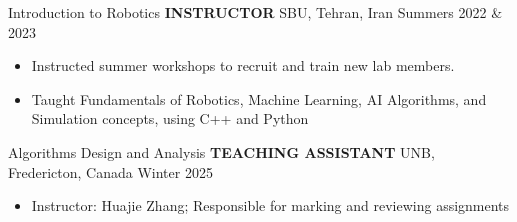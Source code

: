     
\begin{cventries}
    \cventry
    {Introduction to Robotics}
    {\textbf{INSTRUCTOR}}
    {SBU, Tehran, Iran}
    {Summers 2022 \& 2023}
    {
        \begin{itemize}
            \item Instructed summer workshops to recruit and train new lab members.
            \item Taught Fundamentals of Robotics, Machine Learning, AI Algorithms, and Simulation concepts, using C++ and Python
        \end{itemize}
    }
    \vspace{0.4 cm}
\end{cventries}
                    
\begin{cventries}
    \cventry
    {Algorithms Design and Analysis}
    {\textbf{TEACHING ASSISTANT}}
    {UNB, Fredericton, Canada}
    {Winter 2025}
    {
        \begin{itemize}
            \item Instructor: Huajie Zhang; Responsible for marking and reviewing assignments
        \end{itemize}
    }
    \vspace{0.4 cm}
\end{cventries}
            
